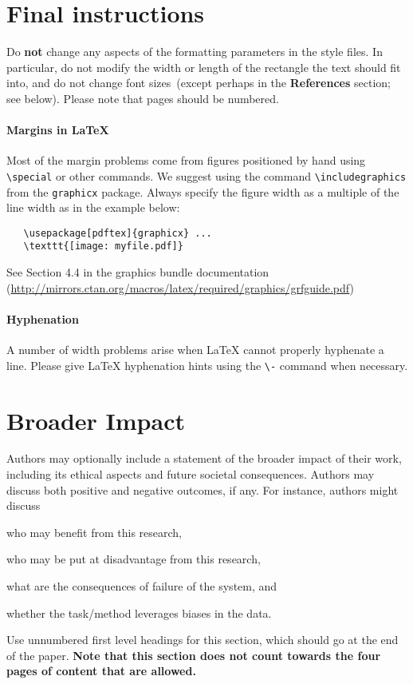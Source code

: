 \documentclass{article}
\begin{document}
\section{Final instructions}

Do \textbf{not} change any aspects of the formatting parameters in the style files.  In
particular, do not modify the width or length of the rectangle the text should
fit into, and do not change font sizes~(except perhaps in the
\textbf{References} section; see below). Please note that pages should be
numbered.

\paragraph{Margins in \LaTeX{}}

Most of the margin problems come from figures positioned by hand using
\verb+\special+ or other commands. We suggest using the command
\verb+\includegraphics+ from the \verb+graphicx+ package. Always specify the
figure width as a multiple of the line width as in the example below:
\begin{verbatim}
   \usepackage[pdftex]{graphicx} ...
   \texttt{[image: myfile.pdf]}
\end{verbatim}
See Section 4.4 in the graphics bundle documentation
(\url{http://mirrors.ctan.org/macros/latex/required/graphics/grfguide.pdf})

\paragraph{Hyphenation}
%
A number of width problems arise when \LaTeX{} cannot properly hyphenate a
line. Please give LaTeX hyphenation hints using the \verb+\-+ command when
necessary.

\section*{Broader Impact}

Authors may optionally include a statement of the broader impact of
their work, including its ethical aspects and future societal
consequences.  Authors may discuss both positive and negative
outcomes, if any. For instance, authors might discuss
%
\begin{inparaenum}[(i)]
  \item who may benefit from this research,
  \item who may be put at disadvantage from this research,
  \item what are the consequences of failure of the system, and
  \item whether the task/method leverages biases in the data.
\end{inparaenum}
%
Use unnumbered first level headings for this section, which should go at
the end of the paper. \textbf{Note that this section does not count towards
the four pages of content that are allowed.}
\end{document}
